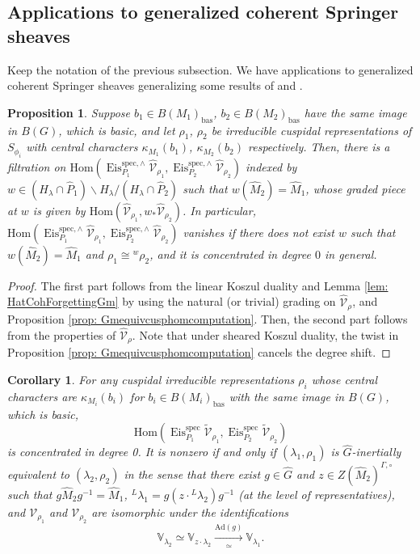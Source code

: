 \documentclass{amsart}
\newtheorem{proposition}[theorem]{Proposition}
\newtheorem{corollary}[theorem]{Corollary}
\theoremstyle{definition}
\theoremstyle{remark}
\numberwithin{equation}{section}
\newcommand{\mc}{\mathcal}
\newcommand{\bas}{\mathrm{bas}}
\newcommand{\Hom}{\mathrm{Hom}}
\newcommand{\spec}{\mathrm{spec}}
\newcommand{\wh}{\widehat}
\DeclareMathOperator{\Eis}{\mathrm{Eis}}
\newcommand{\Ad}{\mathrm{Ad}}
\newcommand{\V}{\mathbb{V}}
\begin{document}
\subsection{Applications to generalized coherent Springer sheaves}

Keep the notation of the previous subsection. We have applications to generalized coherent Springer sheaves generalizing some results of \cite{BCHNspringer} and \cite{ZhuTame}. 

\begin{proposition}{\label{prop: cusphomfilt}}
Suppose $b_1\in B(M_1)_{\bas}$, $b_2\in B(M_2)_{\bas}$ have the same image in $B(G)$, which is basic, and let $\rho_1$, $\rho_2$ be irreducible cuspidal representations of $S_{\phi_i}$ with central characters $\kappa_{M_1}(b_1)$, $\kappa_{M_2}(b_2)$ respectively. Then, there is a filtration on
$\Hom(\Eis^{\spec, \wedge}_{P_1}\wh{\mc V}_{\rho_1}, \Eis^{\spec, \wedge}_{P_2}\wh{\mc V}_{\rho_2})$
indexed by $w\in (H_\lambda \cap \wh P_1)\backslash H_\lambda / (H_\lambda \cap \wh P_2)$ such that $w(\wh{M}_2)=\wh{M}_1$, whose graded piece at $w$ is given by $\Hom (\wh{\mc V}_{\rho_1}, w_* \wh{\mc V}_{\rho_2})$. In particular, $\Hom(\Eis^{\spec, \wedge}_{P_1}\wh{\mc V}_{\rho_1}, \Eis^{\spec, \wedge}_{P_2}\wh{\mc V}_{\rho_2})$ vanishes if there does not exist $w$ such that $w(\wh{M}_2)=\wh{M}_1$ and $\rho_1\cong {}^w\rho_2$, and it is concentrated in degree $0$ in general. 
\end{proposition}

\begin{proof}
The first part follows from the linear Koszul duality and Lemma \ref{lem: HatCohForgettingGm} by using the natural (or trivial) grading on $\wh{\mc V}_\rho$, and Proposition \ref{prop: Gmequivcusphomcomputation}. Then, the second part follows from the properties of $\wh{\mc V}_\rho$. Note that under sheared Koszul duality, the twist in Proposition \ref{prop: Gmequivcusphomcomputation} cancels the degree shift.
\end{proof}

\begin{corollary}{\label{cor: cohspringerhoms}}
For any cuspidal irreducible representations $\rho_i$ whose central characters are $\kappa_{M_i}(b_i)$ for $b_i\in B(M_i)_{\bas}$ with the same image in $B(G)$, which is basic, 
\[
\Hom(\Eis^\spec_{P_1}\widetilde{\mc V}_{\rho_1}, \Eis^\spec_{P_2}\widetilde{\mc V}_{\rho_2})
\]
is concentrated in degree 0. It is nonzero if and only if $(\lambda_1, \rho_1)$ is $\wh G$-inertially equivalent to $(\lambda_2, \rho_2)$ in the sense that there exist $g\in \wh G$ and $z\in Z(\wh M_2)^{\Gamma, \circ}$ such that $g\wh M_2 g^{-1}=\wh M_1$, ${}^L \lambda_1=g(z\cdot {}^L \lambda_2)g^{-1}$ (at the level of representatives), and $\mc V_{\rho_1}$ and $\mc V_{\rho_2}$ are isomorphic under the identifications 
\[
\V_{\lambda_2}\simeq \V_{z\cdot \lambda_2} \xrightarrow[\simeq]{\Ad(g)}\V_{\lambda_1}.
\]
\end{corollary}
\end{document}
